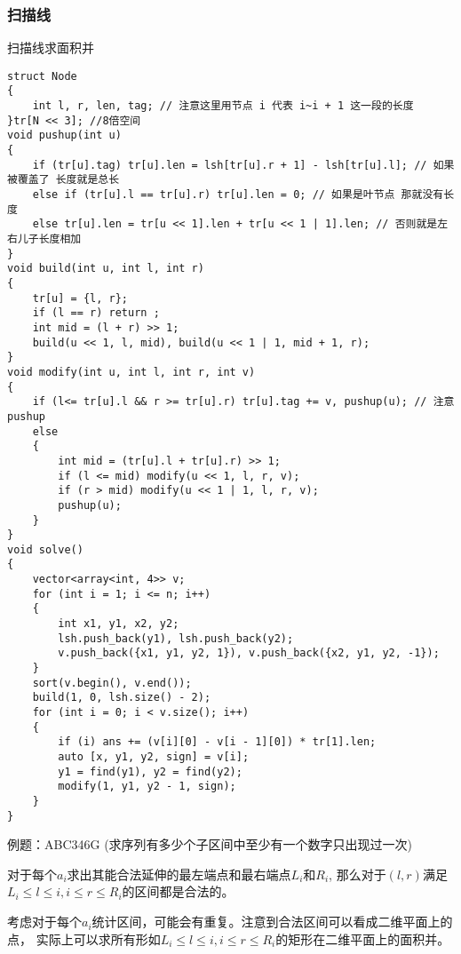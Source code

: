 \documentclass[a4paper, fontset=none]{ctexart}
\begin{document}
\subsubsection{扫描线}
扫描线求面积并
\begin{verbatim}
struct Node
{
    int l, r, len, tag; // 注意这里用节点 i 代表 i~i + 1 这一段的长度
}tr[N << 3]; //8倍空间
void pushup(int u)
{
    if (tr[u].tag) tr[u].len = lsh[tr[u].r + 1] - lsh[tr[u].l]; // 如果被覆盖了 长度就是总长
    else if (tr[u].l == tr[u].r) tr[u].len = 0; // 如果是叶节点 那就没有长度
    else tr[u].len = tr[u << 1].len + tr[u << 1 | 1].len; // 否则就是左右儿子长度相加
}
void build(int u, int l, int r)
{
    tr[u] = {l, r};
    if (l == r) return ;
    int mid = (l + r) >> 1;
    build(u << 1, l, mid), build(u << 1 | 1, mid + 1, r);
}
void modify(int u, int l, int r, int v)
{
    if (l<= tr[u].l && r >= tr[u].r) tr[u].tag += v, pushup(u); // 注意 pushup
    else
    {
        int mid = (tr[u].l + tr[u].r) >> 1;
        if (l <= mid) modify(u << 1, l, r, v);
        if (r > mid) modify(u << 1 | 1, l, r, v);
        pushup(u);
    }
}
void solve()
{
    vector<array<int, 4>> v;
    for (int i = 1; i <= n; i++)
    {
        int x1, y1, x2, y2;
        lsh.push_back(y1), lsh.push_back(y2);
        v.push_back({x1, y1, y2, 1}), v.push_back({x2, y1, y2, -1});
    }
    sort(v.begin(), v.end());
    build(1, 0, lsh.size() - 2);
    for (int i = 0; i < v.size(); i++)
    {
        if (i) ans += (v[i][0] - v[i - 1][0]) * tr[1].len;
        auto [x, y1, y2, sign] = v[i];
        y1 = find(y1), y2 = find(y2);
        modify(1, y1, y2 - 1, sign);
    }
}
\end{verbatim}

例题：ABC346G (求序列有多少个子区间中至少有一个数字只出现过一次)

对于每个$a_i$求出其能合法延伸的最左端点和最右端点$L_i$和$R_i$,
那么对于$(l, r)$满足$L_i\leqslant l\leqslant i, i\leqslant r\leqslant R_i$的区间都是合法的。

考虑对于每个$a_i$统计区间，可能会有重复。注意到合法区间可以看成二维平面上的点，
实际上可以求所有形如$L_i\leqslant l\leqslant i, i\leqslant r\leqslant R_i$的矩形在二维平面上的面积并。
\end{document}
